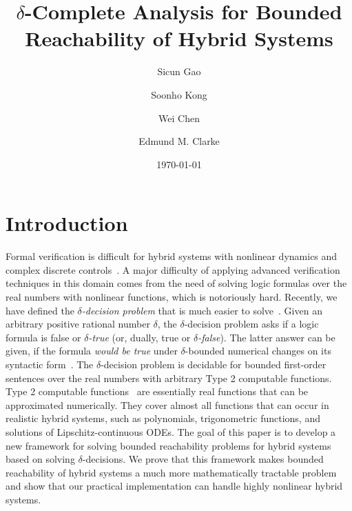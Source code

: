 \documentclass[12pt]{llncs}
\title{$\delta$-Complete Analysis for Bounded Reachability of Hybrid Systems}
\author{Sicun Gao \and Soonho Kong \and Wei Chen \and Edmund M. Clarke}
\date{\today}
\begin{document}
\renewcommand*{\thepage}{title-\arabic{page}}
\maketitle
\renewcommand*{\thepage}{\arabic{page}}

\section{Introduction}
Formal verification is difficult for hybrid systems with nonlinear dynamics and complex discrete controls~\cite{DBLP:conf/emsoft/Alur11,DBLP:conf/lics/Henzinger96}. A major difficulty of applying advanced verification techniques in this domain comes from the need of solving logic formulas over the real numbers with nonlinear functions, which is notoriously hard. Recently, we have defined the {\em $\delta$-decision problem} that is much easier to solve~\cite{DBLP:conf/lics/GaoAC12,DBLP:conf/cade/GaoAC12}. Given an arbitrary positive rational number $\delta$, the $\delta$-decision problem asks if a logic formula is false or {\em $\delta$-true} (or, dually, true or {\em $\delta$-false}). The latter answer can be given, if the formula {\em would be true} under $\delta$-bounded numerical changes on its syntactic form~\cite{DBLP:conf/lics/GaoAC12}. The $\delta$-decision problem is decidable for bounded first-order sentences over the real numbers with arbitrary Type 2 computable functions. Type 2 computable functions~\cite{CAbook} are essentially real functions that can be approximated numerically. They cover almost all functions that can occur in realistic hybrid systems, such as polynomials, trigonometric functions, and solutions of Lipschitz-continuous ODEs. The goal of this paper is to develop a new framework for solving bounded reachability problems for hybrid systems based on solving $\delta$-decisions. We prove that this framework makes bounded reachability of hybrid systems a much more mathematically tractable problem and show that our practical implementation can handle highly nonlinear hybrid systems.
\end{document}
